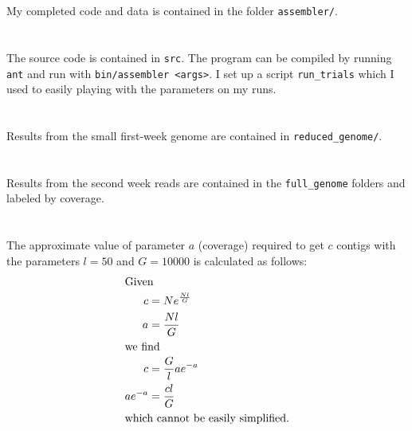 \documentclass[10pt,letterpaper]{article}
\begin{document}
My completed code and data is contained in the folder \texttt{assembler/}.

\section{}
The source code is contained in \texttt{src}. The program can be compiled by running \texttt{ant} and run with \texttt{bin/assembler <args>}. I set up a script \texttt{run\_trials} which I used to easily playing with the parameters on my runs.

\section{}
Results from the small first-week genome are contained in \texttt{reduced\_genome/}.

\section{}
Results from the second week reads are contained in the \texttt{full\_genome} folders and labeled by coverage.

\section{}
The approximate value of parameter $a$ (coverage) required to get $c$ contigs with the parameters $l = 50$ and $G = 10000$ is calculated as follows:
\begin{align*}
 \intertext{Given}
 c &= Ne^\frac{Nl}{G}\\
 a &= \frac{Nl}{G}\\
 \intertext{we find}
 c &= \frac{G}{l}ae^{-a}\\
 ae^{-a} &= \frac{cl}{G}\\
 \intertext{which cannot be easily simplified.}
\end{align*}
\end{document}
